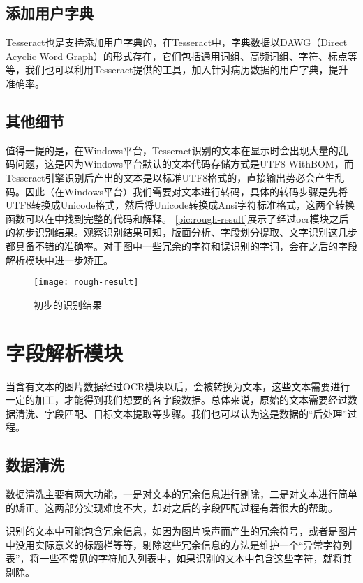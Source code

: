 \subsection{添加用户字典}
Tesseract也是支持添加用户字典的，在Tesseract中，字典数据以DAWG（Direct Acyclic Word Graph）的形式存在，它们包括通用词组、高频词组、字符、标点等等，我们也可以利用Tesseract提供的工具，加入针对病历数据的用户字典，提升准确率。

\subsection{其他细节}
值得一提的是，在Windows平台，Tesseract识别的文本在显示时会出现大量的乱码问题，这是因为Windows平台默认的文本代码存储方式是UTF8-WithBOM，而Tesseract引擎识别后产出的文本是以标准UTF8格式的，直接输出势必会产生乱码。因此（在Windows平台）我们需要对文本进行转码，具体的转码步骤是先将UTF8转换成Unicode格式，然后将Unicode转换成Ansi字符标准格式，这两个转换函数可以在\citep{character-encoding}中找到完整的代码和解释。
\autoref{pic:rough-result}展示了经过ocr模块之后的初步识别结果。观察识别结果可知，版面分析、字段划分提取、文字识别这几步都具备不错的准确率。对于图中一些冗余的字符和误识别的字词，会在之后的字段解析模块中进一步矫正。
\begin{figure}[htbp]
	\centering
	\caption{初步的识别结果}
	\texttt{[image: rough-result]}
	\label{pic:rough-result}
\end{figure}

\section{字段解析模块}  %
当含有文本的图片数据经过OCR模块以后，会被转换为文本，这些文本需要进行一定的加工，才能得到我们想要的各字段数据。总体来说，原始的文本需要经过数据清洗、字段匹配、目标文本提取等步骤。我们也可以认为这是数据的“后处理”过程。

\subsection{数据清洗}
数据清洗主要有两大功能，一是对文本的冗余信息进行剔除，二是对文本进行简单的矫正。这两部分实现难度不大，却对之后的字段匹配过程有着很大的帮助。

识别的文本中可能包含冗余信息，如因为图片噪声而产生的冗余符号，或者是图片中没用实际意义的标题栏等等，剔除这些冗余信息的方法是维护一个“异常字符列表”，将一些不常见的字符加入列表中，如果识别的文本中包含这些字符，就将其剔除。


